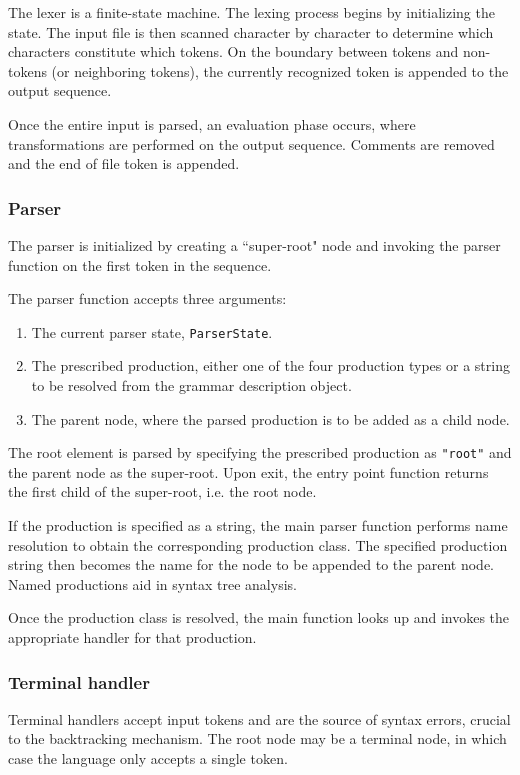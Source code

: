 \documentclass{article}
\begin{document}
	The lexer is a finite-state machine. The lexing process begins by
	initializing the state. The input file is then scanned character by character
	to determine which characters constitute which tokens. On the boundary between
	tokens and non-tokens (or neighboring tokens), the currently recognized token
	is appended to the output sequence.

	Once the entire input is parsed, an evaluation phase occurs, where transformations
	are performed on the output sequence. Comments are removed and the end of
	file token is appended.

	\subsubsection{Parser}

	The parser is initialized by creating a ``super-root" node and invoking
	the parser function on the first token in the sequence.

	The parser function accepts three arguments:
	\begin{enumerate}
		\item The current parser state, \texttt{ParserState}.
		\item The prescribed production, either one of the four production types
		or a string to be resolved from the grammar description object.
		\item The parent node, where the parsed production is to be added as a
		child node.
	\end{enumerate}
	The root element is parsed by specifying the prescribed production as
	\texttt{"root"} and the parent node as the super-root. Upon exit, the
	entry point function returns the first child of the super-root, i.e. the
	root node.

	If the production is specified as a string, the main parser function
	performs name resolution to obtain the corresponding production class.
	The specified production string then becomes the name for the node to be
	appended to the parent node. Named productions aid in syntax tree analysis.

	Once the production class is resolved, the main function looks up and
	invokes the appropriate handler for that production.

	\subsubsection{Terminal handler}

	Terminal handlers accept input tokens and are the source of syntax errors,
	crucial to the backtracking mechanism. The root node may be a terminal node,
	in which case the language only accepts a single token.
\end{document}
